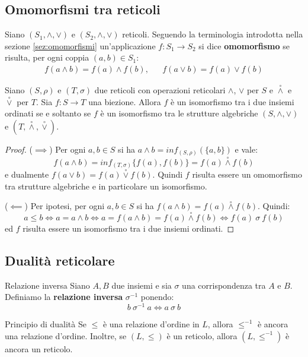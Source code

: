 \subsection{Omomorfismi tra reticoli}
Siano $(S_{1},\wedge,\vee)$ e $(S_{2},\wedge,\vee)$ reticoli. Seguendo la terminologia introdotta nella sezione \ref{sez:omomorfismi} un'applicazione $f: S_{1} \longrightarrow S_{2}$ si dice \textbf{omomorfismo}  se risulta, per ogni coppia $(a,b) \in S_{1}$:
\begin{displaymath}
	\begin{array}{lll}
		f(a \wedge b) = f(a) \wedge f(b), & & f(a \vee b) = f(a) \vee f(b)
	\end{array}
\end{displaymath}


\begin{teorbox}
	Siano $(S,\rho)$ e $(T, \sigma)$ due reticoli con operazioni reticolari $\wedge$, $\vee$ per $S$ e $\stackrel{\circ}{\wedge}$ e $\stackrel{\circ}{\vee}$ per $T$. Sia $f:S \rightarrow T$ una biezione. Allora $f$ è un isomorfismo tra i due insiemi ordinati se e soltanto se $f$ è un isomorfismo tra le strutture algebriche $(S,\wedge,\vee)$ e $(T,\stackrel{\circ}{\wedge} ,\stackrel{\circ}{\vee})$.
\end{teorbox}

\begin{proof}
	($\implies$) Per ogni $a,b \in S$ si ha $a \wedge b = inf_{(S,\rho)} (\{a,b\})$ e vale:
	\begin{displaymath}
		f(a \wedge b) = inf_{(T,\sigma)}\{f(a),f(b)\}=f(a) \stackrel{\circ}{\wedge} f(b)
	\end{displaymath}
	e dualmente $f(a \vee b) = f(a) \stackrel{\circ}{\vee} f(b)$. Quindi $f$ risulta essere un omomorfismo tra strutture algebriche e in particolare un isomorfismo.
	
	($\impliedby$) Per ipotesi, per ogni $a,b \in S$ si ha $f(a \wedge b) = f(a) \stackrel{\circ}{\wedge} f(b)$. Quindi:
	\begin{displaymath}
		a \leq b \iff a = a \wedge b \iff a = f(a \wedge b) = f(a) \stackrel{\circ}{\wedge} f(b) \iff f(a) \ \sigma \ f(b)
	\end{displaymath}
	ed $f$ risulta essere un isomorfismo tra i due insiemi ordinati.
\end{proof}

\subsection{Dualità reticolare}
\begin{defbox}{Relazione inversa}
	Siano $A,B$ due insiemi e sia $\sigma$ una corrispondenza tra $A$ e $B$. Definiamo la \textbf{relazione inversa} $\sigma^{-1}$ ponendo:
	\begin{displaymath}
		b \ \sigma^{-1} \ a \iff a \ \sigma \ b
	\end{displaymath}
\end{defbox}
\begin{propbox}{Principio di dualità}
	Se $\leq$ è una relazione d'ordine in $L$, allora $\leq^{-1}$ è ancora una relazione d'ordine. Inoltre, se $(L,\leq)$ è un reticolo, allora $(L,\leq^{-1})$ è ancora un reticolo.
\end{propbox}

